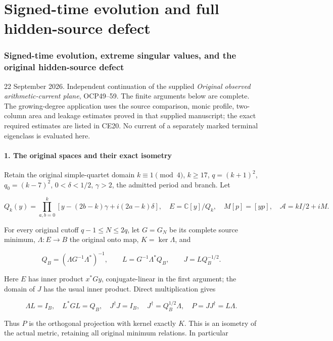 \documentclass[10pt]{article}
\begin{document}
\clearpage\part{Signed-time evolution and full hidden-source defect}
\section{Signed-time evolution, extreme singular values, and the original hidden-source defect}\label{signed-time-evolution-extreme-singular-values-and-the-original-hidden-source-defect}

22 September 2026. Independent continuation of the supplied \emph{Original observed arithmetic-current plane}, OCP49--59. The finite arguments below are complete. The growing-degree application uses the source comparison, monic profile, two-column area and leakage estimates proved in that supplied manuscript; the exact required estimates are listed in CE20. No current of a separately marked terminal eigenclass is evaluated here.

\subsection{1. The original spaces and their exact isometry}\label{the-original-spaces-and-their-exact-isometry}

Retain the original simple-quartet domain \(k\equiv1\pmod4\), \(k\ge17\), \(q=(k+1)^2\), \(q_0=(k-7)^2\), \(0<\delta<1/2\), \(\gamma>2\), the admitted period and branch. Let

\[
Q_k(y)=\prod_{a,b=0}^k[y-(2b-k)\gamma+i(2a-k)\delta],\quad
E=\mathbb C[y]/Q_k,\quad M[p]=[yp],\quad \mathscr A=kI/2+iM. \tag{CE1}
\]

For every original cutoff \(q-1\le N\le2q\), let \(G=G_N\) be its complete source minimum, \(\Lambda:E\to B\) the original onto map, \(K=\ker\Lambda\), and

\[
Q_B=(\Lambda G^{-1}\Lambda^*)^{-1},\qquad
L=G^{-1}\Lambda^*Q_B,\qquad J=LQ_B^{-1/2}. \tag{CE2}
\]

Here \(E\) has inner product \(x^*Gy\), conjugate-linear in the first argument; the domain of \(J\) has the usual inner product. Direct multiplication gives

\[
\Lambda L=I_B,\quad L^*GL=Q_B,\quad J^\dagger J=I_B,
\quad J^\dagger=Q_B^{1/2}\Lambda,\quad P=JJ^\dagger=L\Lambda. \tag{CE3}
\]

Thus \(P\) is the orthogonal projection with kernel exactly \(K\). This is an isometry of the actual metric, retaining all original minimum relations. In particular
\end{document}
